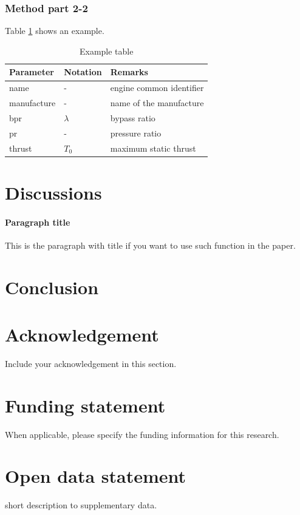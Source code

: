 \documentclass[
  manuscript=article,  %
  layout=preprint,  %
  year=20xx,
  volume=x,
  IssueNumber=x
]{extra/mjcis}
\begin{document}
\subsubsection{Method part 2-2}

\blindtext Table \ref{tb:example_table} shows an example.

\begin{table}[H]
  \centering
  \small
  \caption{Example table}
  \label{tb:example_table}
  \begin{tabular}{lll}
  \toprule
  \textbf{Parameter} & \textbf{Notation} & \textbf{Remarks} \\
  \midrule
  name & - & engine common identifier \\
  manufacture & - & name of the manufacture  \\
  bpr & $\lambda$ & bypass ratio \\
  pr & - & pressure ratio \\
  thrust & $T_0$ & maximum static thrust\\
  \bottomrule
  \end{tabular}
\end{table}

\blindtext


\section{Discussions}

\paragraph{Paragraph title} This is the paragraph with title if you want to use such function in the paper. \blindtext


\section{Conclusion}

\blindtext





\section*{Acknowledgement}
Include your acknowledgement in this section.


\section*{Funding statement}
When applicable, please specify the funding information for this research.


\section*{Open data statement}
short description to supplementary data.





\printbibliography
\end{document}
